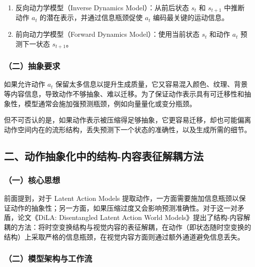 \begin{enumerate}
\def\labelenumi{\arabic{enumi}.}
\tightlist
\item
  反向动力学模型（Inverse Dynamics Model）：从前后状态 \(s_t\) 和 \(s_{t+1}\) 中推断动作 \(a_t\) 的潜在表示，并通过信息瓶颈促使 \(a_t\) 编码最关键的运动信息。
\item
  前向动力学模型（Forward Dynamics Model）：使用当前状态 \(s_t\) 和动作 \(a_t\) 预测下一状态 \(s_{t+1}\)。
\end{enumerate}

\hypertarget{ux4e8cux62bdux8c61ux8981ux6c42}{%
\subsubsection{（二）抽象要求}\label{ux4e8cux62bdux8c61ux8981ux6c42}}

如果允许动作 \(a_t\) 保留太多信息以提升生成质量，它又容易混入颜色、纹理、背景等内容信息，导致动作不够抽象、难以迁移。为了保证动作表示具有可迁移性和抽象性，模型通常会施加强预测瓶颈，例如向量量化或变分瓶颈。

但不可否认的是，如果动作表示被压缩得足够抽象，它更容易迁移，却也可能偏离动作空间内在的流形结构，丢失预测下一个状态的准确性，以及生成所需的细节。

\hypertarget{ux4e8cux52a8ux4f5cux62bdux8c61ux5316ux4e2dux7684ux7ed3ux6784-ux5185ux5bb9ux8868ux5f81ux89e3ux8026ux65b9ux6cd5}{%
\subsection{二、动作抽象化中的结构-内容表征解耦方法}\label{ux4e8cux52a8ux4f5cux62bdux8c61ux5316ux4e2dux7684ux7ed3ux6784-ux5185ux5bb9ux8868ux5f81ux89e3ux8026ux65b9ux6cd5}}

\hypertarget{ux4e00ux6838ux5fc3ux601dux60f3-25}{%
\subsubsection{（一）核心思想}\label{ux4e00ux6838ux5fc3ux601dux60f3-25}}

前面提到，对于 Latent Action Models 提取动作，一方面需要施加信息瓶颈以保证动作的抽象性；另一方面，如果压缩过度又会影响预测准确性。对于这一对矛盾，论文《DiLA: Disentangled Latent Action World Models》提出了结构-内容解耦的方法：将时空变换结构与视觉内容的表征解耦，在动作（即状态随时空变换的结构）上采取严格的信息瓶颈，在视觉内容方面则通过额外通道避免信息丢失。

\hypertarget{ux4e8cux6a21ux578bux67b6ux6784ux4e0eux5de5ux4f5cux6d41-1}{%
\subsubsection{（二）模型架构与工作流}\label{ux4e8cux6a21ux578bux67b6ux6784ux4e0eux5de5ux4f5cux6d41-1}}

